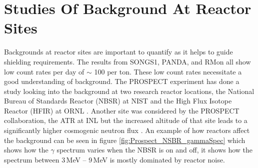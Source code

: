 \section{Studies Of Background At Reactor Sites}
Backgrounds at reactor sites are important to quantify as it helps to guide shielding requirements. The results from SONGS1, PANDA, and RMon all show low count rates per day of $\sim$ 100 per ton. These low count rates necessitate a good understanding of background. The PROSPECT experiment has done a  study looking into the background at two research reactor locations, the National Bureau of Standards Reactor (NBSR) at NIST and the High Flux Isotope Reactor (HFIR) at ORNL \cite{Ashenfelter_2016}. Another site was considered by the PROSPECT collaboration, the ATR at INL but the increased altitude of that site leads to a significantly higher cosmogenic neutron flux \cite{Ashenfelter_2016}. An example of how reactors affect the background can be seen in figure \ref{fig:Prospect_NSBR_gammaSpec} which shows how the $\gamma$ spectrum varies when the NBSR is on and off, it shows how the spectrum between 3\,MeV -- 9\,MeV is mostly dominated by reactor noise. 
